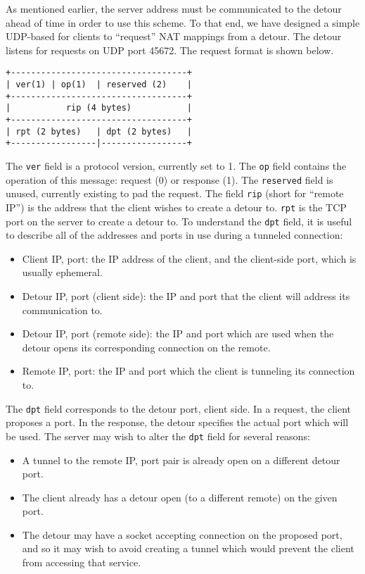 As mentioned earlier, the server address must be communicated to the detour
ahead of time in order to use this scheme. To that end, we have designed a
simple UDP-based for clients to ``request'' NAT mappings from a detour. The
detour listens for requests on UDP port 45672. The request format is shown
below.

\begin{lstlisting}
+-----------------------------------+
| ver(1) | op(1)  | reserved (2)    |
+-----------------------------------+
|           rip (4 bytes)           |
+-----------------------------------+
| rpt (2 bytes)   | dpt (2 bytes)   |
+-----------------|-----------------+
\end{lstlisting}

The \texttt{ver} field is a protocol version, currently set to 1. The
\texttt{op} field contains the operation of this message: request (0) or
response (1). The \texttt{reserved} field is unused, currently existing to pad
the request. The field \texttt{rip} (short for ``remote IP'') is the address
that the client wishes to create a detour to. \texttt{rpt} is the TCP port on
the server to create a detour to. To understand the \texttt{dpt} field, it is
useful to describe all of the addresses and ports in use during a tunneled
connection:
\begin{itemize}
\item Client IP, port: the IP address of the client, and the client-side port,
  which is usually ephemeral.
\item Detour IP, port (client side): the IP and port that the client will
  address its communication to.
\item Detour IP, port (remote side): the IP and port which are used when the
  detour opens its corresponding connection on the remote.
\item Remote IP, port: the IP and port which the client is tunneling its
  connection to.
\end{itemize}

The \texttt{dpt} field corresponds to the detour port, client side. In a
request, the client proposes a port. In the response, the detour specifies the
actual port which will be used. The server may wish to alter the \texttt{dpt}
field for several reasons:
\begin{itemize}
\item A tunnel to the remote IP, port pair is already open on a different detour
  port.
\item The client already has a detour open (to a different remote) on the given
  port.
\item The detour may have a socket accepting connection on the proposed port,
  and so it may wish to avoid creating a tunnel which would prevent the client
  from accessing that service.
\end{itemize}

